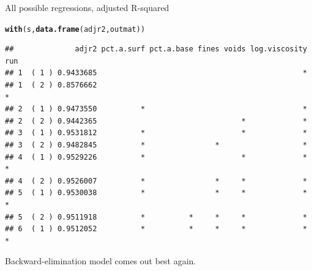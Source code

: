 \documentclass[unknownkeysallowed]{beamer}\usepackage[]{graphicx}\usepackage[]{color}
\makeatletter
\newcommand{\hlstd}[1]{\textcolor[rgb]{0.345,0.345,0.345}{#1}}%
\newcommand{\hlkwd}[1]{\textcolor[rgb]{0.737,0.353,0.396}{\textbf{#1}}}%
\newenvironment{kframe}{%
 \def\at@end@of@kframe{}%
 \ifinner\ifhmode%
  \def\at@end@of@kframe{\end{minipage}}%
  \begin{minipage}{\columnwidth}%
 \fi\fi%
 \def\FrameCommand##1{\hskip\@totalleftmargin \hskip-\fboxsep
 \colorbox{shadecolor}{##1}\hskip-\fboxsep
     \hskip-\linewidth \hskip-\@totalleftmargin \hskip\columnwidth}%
 \MakeFramed {\advance\hsize-\width
   \@totalleftmargin\z@ \linewidth\hsize
   \@setminipage}}%
 {\par\unskip\endMakeFramed%
 \at@end@of@kframe}
\newenvironment{knitrout}{}{} %
\makeatother
\begin{document}
\begin{frame}[fragile]{All possible regressions, adjusted R-squared}

\begin{knitrout}\scriptsize
{}\color{fgcolor}\begin{kframe}
\begin{alltt}
\hlkwd{with}\hlstd{(s,}\hlkwd{data.frame}\hlstd{(adjr2,outmat))}
\end{alltt}
\begin{verbatim}
##              adjr2 pct.a.surf pct.a.base fines voids log.viscosity run
## 1  ( 1 ) 0.9433685                                               *    
## 1  ( 2 ) 0.8576662                                                   *
## 2  ( 1 ) 0.9473550          *                                    *    
## 2  ( 2 ) 0.9442365                                 *             *    
## 3  ( 1 ) 0.9531812          *                      *             *    
## 3  ( 2 ) 0.9482845          *                *                   *    
## 4  ( 1 ) 0.9529226          *                      *             *   *
## 4  ( 2 ) 0.9526007          *                *     *             *    
## 5  ( 1 ) 0.9530038          *                *     *             *   *
## 5  ( 2 ) 0.9511918          *          *     *     *             *    
## 6  ( 1 ) 0.9512052          *          *     *     *             *   *
\end{verbatim}
\end{kframe}
\end{knitrout}


Backward-elimination model comes out best again.
  
\end{frame}
\end{document}

